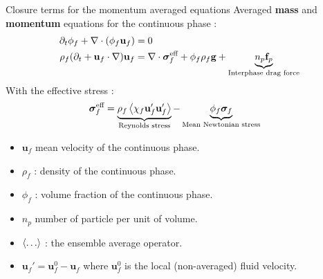 \documentclass{sintefbeamer}
\begin{document}
\begin{frame}{Closure terms for the momentum averaged equations }
  Averaged \textbf{mass} and \textbf{momentum} equations for the continuous phase :
\begin{align*}
  \partial_t \phi_f   
  + \mathbf{\nabla}\cdot (\phi_f \textbf{u}_f)
  &= 
  0\\
  \rho_f (\partial_t + \textbf{u}_f \cdot\mathbf{\nabla})\textbf{u}_f
  &= 
  \mathbf{\nabla}\cdot\bm\sigma_f^\text{eff}
  + \phi_f  \rho_f \textbf{g}
  + 
  \underbrace{
    n_p \textbf{f}_p
  }_\text{Interphase drag force}
\end{align*}
With the effective stress : 
\begin{align*}
  &\bm{\sigma}_f^\text{eff}
  = 
   \underbrace{\rho_f\left<\chi_f \textbf{u}_f'\textbf{u}_f'\right>}_\text{Reynolds stress}
    - \underbrace{\phi_f \bm{\sigma}_f}_\text{Mean Newtonian stress}
\end{align*}
\begin{itemize}
  \item $\textbf{u}_f$ mean velocity of the continuous phase.  
  \item $\rho_f$ : density of the continuous phase. 
  \item $\phi_f$ : volume fraction of the continuous phase. 
  \item $n_p$ number of particle per unit of volume. 
  \item $\left<\ldots\right>$ : the ensemble average operator. 
  \item $\textbf{u}_f' = \textbf{u}^0_f - \textbf{u}_f$ where $\textbf{u}_f^0$ is the local (non-averaged) fluid velocity. 
\end{itemize}
\end{frame}
\end{document}

